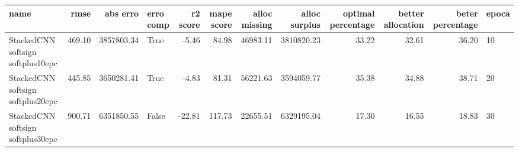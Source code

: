 \begin{tabular}{lrrlrrrrrrrl}
\toprule
name & rmse & abs erro & erro comp & r2 score & mape score & alloc missing & alloc surplus & optimal percentage & better allocation & beter percentage & epoca \\
\midrule
StackedCNN softsign softplus10epc & 469.10 & 3857803.34 & True & -5.46 & 84.98 & 46983.11 & 3810820.23 & 33.22 & 32.61 & 36.20 & 10 \\
StackedCNN softsign softplus20epc & 445.85 & 3650281.41 & True & -4.83 & 81.31 & 56221.63 & 3594059.77 & 35.38 & 34.88 & 38.71 & 20 \\
StackedCNN softsign softplus30epc & 900.71 & 6351850.55 & False & -22.81 & 117.73 & 22655.51 & 6329195.04 & 17.30 & 16.55 & 18.83 & 30 \\
\bottomrule
\end{tabular}
